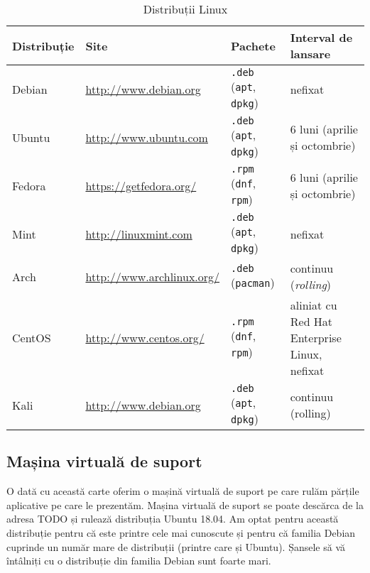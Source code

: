 \begin{table}[!htb]
  \caption{Distribuții Linux}
  \begin{center}
    \begin{tabular}{ p{} p{} p{} p{} }
      \toprule
        \textbf{Distribuție} &
        \textbf{Site} &
        \textbf{Pachete} &
        \textbf{Interval de lansare} \\
      \midrule
        Debian &
        \url{http://www.debian.org} &
        \texttt{.deb} (\texttt{apt}, \texttt{dpkg}) &
        nefixat \\
        Ubuntu &
        \url{http://www.ubuntu.com} &
        \texttt{.deb} (\texttt{apt}, \texttt{dpkg}) &
        6 luni (aprilie și octombrie) \\
        Fedora &
        \url{https://getfedora.org/} &
        \texttt{.rpm} (\texttt{dnf}, \texttt{rpm}) &
        6 luni (aprilie și octombrie) \\
        Mint &
        \url{http://linuxmint.com} &
        \texttt{.deb} (\texttt{apt}, \texttt{dpkg}) &
        nefixat \\
        Arch &
        \url{http://www.archlinux.org/} &
        \texttt{.deb} (\texttt{pacman}) &
        continuu (\textit{rolling}) \\
        CentOS &
        \url{http://www.centos.org/} &
        \texttt{.rpm} (\texttt{dnf}, \texttt{rpm}) &
        aliniat cu Red Hat Enterprise Linux, nefixat\\
        Kali &
        \url{http://www.debian.org} &
        \texttt{.deb} (\texttt{apt}, \texttt{dpkg}) &
        continuu (rolling) \\
      \bottomrule
    \end{tabular}
    \label{tab:intro:distro}
  \end{center}
\end{table}

\subsection{Mașina virtuală de suport}
\label{sec:intro:vm}

O dată cu această carte oferim o mașină virtuală de suport pe care rulăm părțile aplicative pe care le prezentăm. Mașina virtuală de suport se poate descărca de la adresa TODO și rulează distribuția Ubuntu 18.04. Am optat pentru această distribuție pentru că este printre cele mai cunoscute și pentru că familia Debian cuprinde un număr mare de distribuții (printre care și Ubuntu). Șansele să vă întâlniți cu o distribuție din familia Debian sunt foarte mari.

